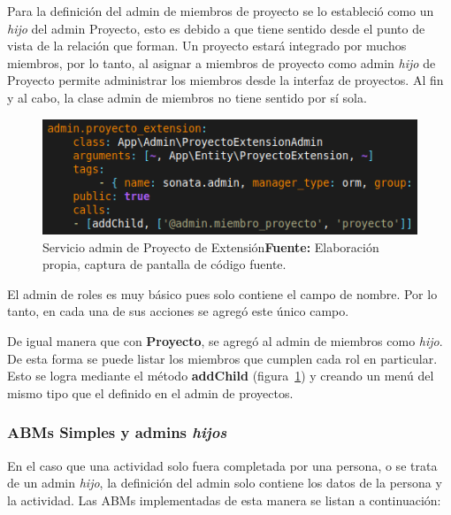 Para la definición del admin de miembros de proyecto se lo estableció como un \textit{hijo} del admin Proyecto, esto es debido a que tiene sentido desde el punto
de vista de la relación que forman. Un proyecto estará integrado por muchos miembros, por lo tanto, al asignar a miembros de proyecto como admin \textit{hijo}
de Proyecto permite administrar los miembros desde la interfaz de proyectos. Al fin y al cabo, la clase admin de miembros no tiene sentido por sí sola.



\begin{figure}[h!]
    \includegraphics[width=1\linewidth]{image/addChild.png}
    \caption{Servicio admin de Proyecto de Extensión\newline \textbf{Fuente:} Elaboración propia, captura de pantalla de código fuente.}
    \label{fig:image/addChild}
\end{figure}

%

El admin de roles es muy básico pues solo contiene el campo de nombre. Por lo tanto, en cada una de sus acciones se agregó este único campo.


De igual manera que con \textbf{Proyecto}, se agregó al admin de miembros como \textit{hijo}. De esta forma se puede listar los miembros que cumplen cada rol en
particular.
Esto se logra mediante el método \textbf{addChild} (figura~\ref{fig:image/addChild}) y creando un menú del mismo tipo que el definido en el admin de proyectos.

\subsubsection{ABMs Simples y admins \textit{hijos}}%
\label{ssub:ambs_simples}

En el caso que una actividad solo fuera completada por una persona, o se trata de un admin \textit{hijo}, la definición del admin solo contiene los
datos de la persona y la actividad\@. Las ABMs implementadas de esta manera se listan a continuación:

